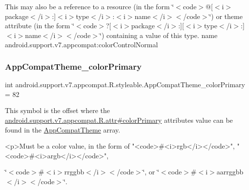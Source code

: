 This may also be a reference to a resource (in the form \char`\"{}$<$code$>$@\mbox{[}$<$i$>$package$<$/i$>$\+:\mbox{]}$<$i$>$type$<$/i$>$\+:$<$i$>$name$<$/i$>$$<$/code$>$\char`\"{}) or theme attribute (in the form \char`\"{}$<$code$>$?\mbox{[}$<$i$>$package$<$/i$>$\+:\mbox{]}\mbox{[}$<$i$>$type$<$/i$>$\+:\mbox{]}$<$i$>$name$<$/i$>$$<$/code$>$\char`\"{}) containing a value of this type.  name android.\+support.\+v7.\+appcompat\+:color\+Control\+Normal \mbox{\label{classandroid_1_1support_1_1v7_1_1appcompat_1_1R_1_1styleable_a26d76193ccbedca9d0812bd6a9da153c}} 
\subsubsection{\texorpdfstring{App\+Compat\+Theme\+\_\+color\+Primary}{AppCompatTheme\_colorPrimary}}
{\footnotesize\ttfamily int android.\+support.\+v7.\+appcompat.\+R.\+styleable.\+App\+Compat\+Theme\+\_\+color\+Primary = 82\hspace{0.3cm}{\ttfamily [static]}}

This symbol is the offset where the \hyperlink{classandroid_1_1support_1_1v7_1_1appcompat_1_1R_1_1attr_ac308ca56c74b10e8e633ed6f3e0d7cdc}{android.\+support.\+v7.\+appcompat.\+R.\+attr\#color\+Primary} attribute\textquotesingle{}s value can be found in the \hyperlink{classandroid_1_1support_1_1v7_1_1appcompat_1_1R_1_1styleable_a5c42f89e8a410c323be34208d75c430b}{App\+Compat\+Theme} array.

\begin{DoxyVerb}      <p>Must be a color value, in the form of "<code>#<i>rgb</i></code>", "<code>#<i>argb</i></code>",
\end{DoxyVerb}
 \char`\"{}$<$code$>$\#$<$i$>$rrggbb$<$/i$>$$<$/code$>$\char`\"{}, or \char`\"{}$<$code$>$\#$<$i$>$aarrggbb$<$/i$>$$<$/code$>$\char`\"{}. 

